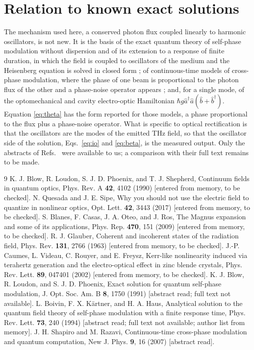 \documentclass[aps,pra,onecolumn,notitlepage,11pt,amsmath,amssymb,nofootinbib]{revtex4-2}
\begin{document}
\section{Relation to known exact solutions}

The mechanism used here, a conserved photon flux coupled linearly to
harmonic oscillators, is not new. It is the basis of the exact quantum theory
of self-phase modulation without dispersion \cite{blow1991} and of its
extension to a response of finite duration, in which the field is coupled to
oscillators of the medium and the Heisenberg equation is solved in closed
form \cite{boivin1994}; of continuous-time models of cross-phase modulation,
where the phase of one beam is proportional to the photon flux of the other
and a phase-noise operator appears \cite{shapirorazavi2007}; and, for a
single mode, of the optomechanical and cavity electro-optic Hamiltonian
$\hbar g\hat a^\dagger\hat a(\hat b+\hat b^\dagger)$. Equation
\eqref{eq:theta} has the form reported for those models, a phase proportional
to the flux plus a phase-noise operator. What is specific to
optical rectification is that the oscillators are the modes of the emitted
THz field, so that the oscillator side of the solution,
Eqs.~\eqref{eq:io} and \eqref{eq:beta}, is the measured output. Only the
abstracts of Refs.~\cite{blow1991,boivin1994} were available to us; a
comparison with their full text remains to be made.

\begin{thebibliography}{9}
 K. J. Blow, R. Loudon, S. J. D. Phoenix, and T. J.
Shepherd, Continuum fields in quantum optics, Phys. Rev. A \textbf{42}, 4102
(1990) [entered from memory, to be checked].
 N. Quesada and J. E. Sipe, Why you should not use the
electric field to quantize in nonlinear optics, Opt. Lett. \textbf{42}, 3443
(2017) [entered from memory, to be checked].
 S. Blanes, F. Casas, J. A. Oteo, and J. Ros, The Magnus
expansion and some of its applications, Phys. Rep. \textbf{470}, 151 (2009)
[entered from memory, to be checked].
 R. J. Glauber, Coherent and incoherent states of the
radiation field, Phys. Rev. \textbf{131}, 2766 (1963) [entered from memory,
to be checked].
 J.-P. Caumes, L. Videau, C. Rouyer, and E. Freysz,
Kerr-like nonlinearity induced via terahertz generation and the
electro-optical effect in zinc blende crystals, Phys. Rev. Lett.
\textbf{89}, 047401 (2002) [entered from memory, to be checked].
 K. J. Blow, R. Loudon, and S. J. D. Phoenix, Exact
solution for quantum self-phase modulation, J. Opt. Soc. Am. B \textbf{8},
1750 (1991) [abstract read; full text not available].
 L. Boivin, F. X. K\"artner, and H. A. Haus, Analytical
solution to the quantum field theory of self-phase modulation with a finite
response time, Phys. Rev. Lett. \textbf{73}, 240 (1994) [abstract read; full
text not available; author list from memory].
 J. H. Shapiro and M. Razavi, Continuous-time
cross-phase modulation and quantum computation, New J. Phys. \textbf{9}, 16
(2007) [abstract read].
\end{thebibliography}
\end{document}

